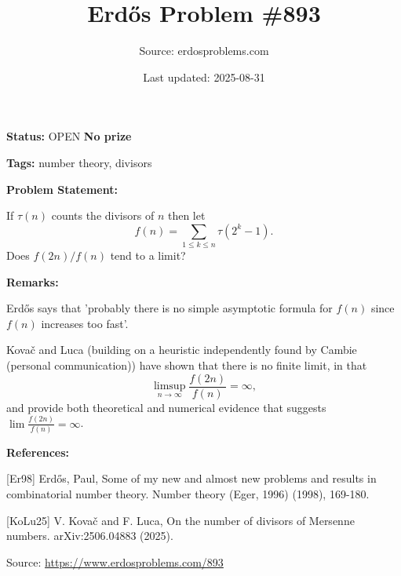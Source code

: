 \documentclass{article}
\title{Erd\H{o}s Problem \#893}
\date{Last updated: 2025-08-31}
\author{Source: erdosproblems.com}
\begin{document}
\maketitle

\noindent\textbf{Status:} OPEN \quad \textbf{No prize}

\noindent\textbf{Tags:} number theory, divisors

\medskip
\noindent\textbf{Problem Statement:}

If $\tau(n)$ counts the divisors of $n$ then let\[f(n)=\sum_{1\leq k\leq n}\tau(2^k-1).\]Does $f(2n)/f(n)$ tend to a limit?

\bigskip
\noindent\textbf{Remarks:}

Erd\H{o}s \cite{Er98} says that 'probably there is no simple asymptotic formula for $f(n)$ since $f(n)$ increases too fast'. 

Kova\v{c} and Luca \cite{KoLu25} (building on a heuristic independently found by Cambie (personal communication)) have shown that there is no finite limit, in that\[\limsup_{n\to \infty}\frac{f(2n)}{f(n)}=\infty,\]and provide both theoretical and numerical evidence that suggests $\lim \frac{f(2n)}{f(n)}=\infty$.

\bigskip
\noindent\textbf{References:}

[Er98] Erd\H{o}s, Paul, Some of my new and almost new problems and results in combinatorial number theory. Number theory (Eger, 1996) (1998), 169-180.
 
 [KoLu25] V. Kova\v{c} and F. Luca, On the number of divisors of Mersenne numbers. arXiv:2506.04883 (2025).

\bigskip
\noindent\small{Source: \url{https://www.erdosproblems.com/893}}
\end{document}
